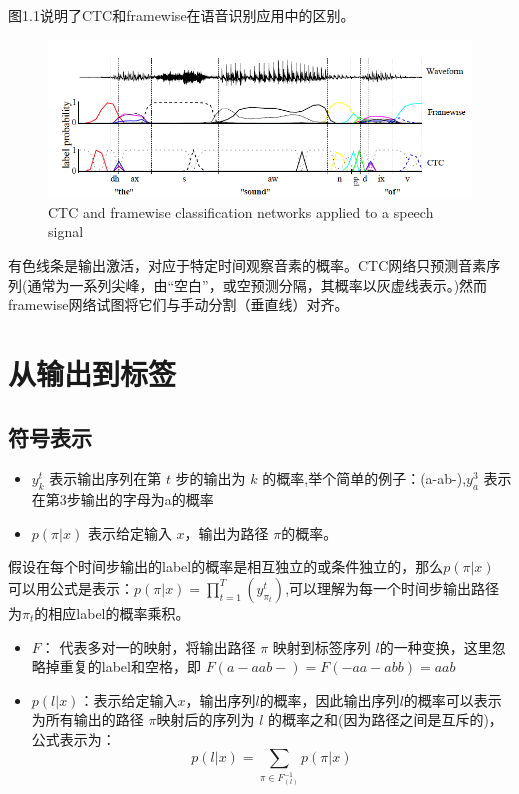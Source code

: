 \documentclass[]{book}
\theoremstyle{definition}
\theoremstyle{definition}
\theoremstyle{definition}
\theoremstyle{remark}
\begin{document}
图1.1说明了CTC和framewise在语音识别应用中的区别。

\begin{figure}

{\centering \includegraphics[width=1\linewidth]{pic/fig1} 

}

\caption{CTC and framewise classification networks applied to a speech signal}\label{fig:unnamed-chunk-1}
\end{figure}

有色线条是输出激活，对应于特定时间观察音素的概率。CTC网络只预测音素序列(通常为一系列尖峰，由``空白''，或空预测分隔，其概率以灰虚线表示。)然而framewise网络试图将它们与手动分割（垂直线）对齐。

\chapter{从输出到标签}\label{From-Outputs-to-Labellings}

\section{符号表示}

\begin{itemize}
\item
  \(y_k^t\) 表示输出序列在第 \(t\) 步的输出为 \(k\)
  的概率,举个简单的例子：(a-ab-),\(y_a^3\)
  表示在第3步输出的字母为a的概率
\item
  \(p(\pi|x)\) 表示给定输入 \(x\)，输出为路径 \(\pi\)的概率。
\end{itemize}

假设在每个时间步输出的label的概率是相互独立的或条件独立的，那么\(p(\pi|x)\)
可以用公式是表示：\(p(\pi|x)=\prod_{t=1}^T(y_{\pi_t}^t)\),可以理解为每一个时间步输出路径为\(\pi_t\)的相应label的概率乘积。

\begin{itemize}
\item
  \(F\)： 代表多对一的映射，将输出路径 \(\pi\) 映射到标签序列
  \(l\)的一种变换，这里忽略掉重复的label和空格，即
  \(F(a-aab-)=F(-aa-abb)=aab\)
\item
  \(p(l|x)\)：表示给定输入\(x\)，输出序列\(l\)的概率，因此输出序列\(l\)的概率可以表示为所有输出的路径
  \(\pi\)映射后的序列为 \(l\)
  的概率之和(因为路径之间是互斥的)，公式表示为：
  \[p(l|x) = \sum_{\pi \in F_{(l)}^{-1}}p(\pi|x)\]
\end{itemize}
\end{document}
